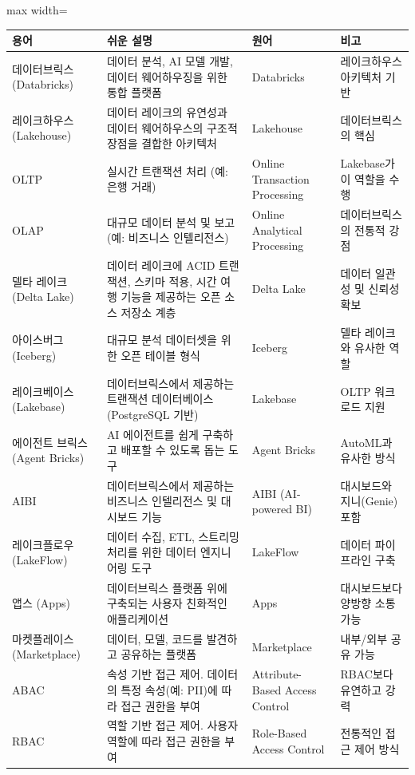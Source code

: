 \documentclass[11pt,a4paper]{article}
\begin{document}
\begin{adjustbox}{max width=\textwidth}
\begin{tabular}{llll}
\toprule
\textbf{용어} & \textbf{쉬운 설명} & \textbf{원어} & \textbf{비고} \\
\midrule
데이터브릭스 (Databricks) & 데이터 분석, AI 모델 개발, 데이터 웨어하우징을 위한 통합 플랫폼 & Databricks & 레이크하우스 아키텍처 기반 \\
레이크하우스 (Lakehouse) & 데이터 레이크의 유연성과 데이터 웨어하우스의 구조적 장점을 결합한 아키텍처 & Lakehouse & 데이터브릭스의 핵심 \\
OLTP & 실시간 트랜잭션 처리 (예: 은행 거래) & Online Transaction Processing & Lakebase가 이 역할을 수행 \\
OLAP & 대규모 데이터 분석 및 보고 (예: 비즈니스 인텔리전스) & Online Analytical Processing & 데이터브릭스의 전통적 강점 \\
델타 레이크 (Delta Lake) & 데이터 레이크에 ACID 트랜잭션, 스키마 적용, 시간 여행 기능을 제공하는 오픈 소스 저장소 계층 & Delta Lake & 데이터 일관성 및 신뢰성 확보 \\
아이스버그 (Iceberg) & 대규모 분석 데이터셋을 위한 오픈 테이블 형식 & Iceberg & 델타 레이크와 유사한 역할 \\
레이크베이스 (Lakebase) & 데이터브릭스에서 제공하는 트랜잭션 데이터베이스 (PostgreSQL 기반) & Lakebase & OLTP 워크로드 지원 \\
에이전트 브릭스 (Agent Bricks) & AI 에이전트를 쉽게 구축하고 배포할 수 있도록 돕는 도구 & Agent Bricks & AutoML과 유사한 방식 \\
AIBI & 데이터브릭스에서 제공하는 비즈니스 인텔리전스 및 대시보드 기능 & AIBI (AI-powered BI) & 대시보드와 지니(Genie) 포함 \\
레이크플로우 (LakeFlow) & 데이터 수집, ETL, 스트리밍 처리를 위한 데이터 엔지니어링 도구 & LakeFlow & 데이터 파이프라인 구축 \\
앱스 (Apps) & 데이터브릭스 플랫폼 위에 구축되는 사용자 친화적인 애플리케이션 & Apps & 대시보드보다 양방향 소통 가능 \\
마켓플레이스 (Marketplace) & 데이터, 모델, 코드를 발견하고 공유하는 플랫폼 & Marketplace & 내부/외부 공유 가능 \\
ABAC & 속성 기반 접근 제어. 데이터의 특정 속성(예: PII)에 따라 접근 권한을 부여 & Attribute-Based Access Control & RBAC보다 유연하고 강력 \\
RBAC & 역할 기반 접근 제어. 사용자 역할에 따라 접근 권한을 부여 & Role-Based Access Control & 전통적인 접근 제어 방식 \\

\end{tabular}
\end{adjustbox}
\end{document}
